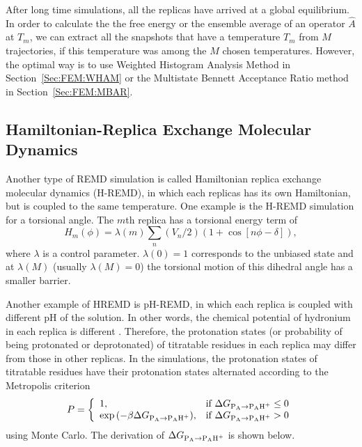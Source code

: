 After long time simulations, all the replicas have arrived at a global equilibrium. In order to calculate the the free energy or the ensemble average of an operator $\hat A$ at $T_m$, we can extract all the snapshots that have a temperature $T_m$ from $M$ trajectories, if this temperature was among the $M$ chosen temperatures. However, the optimal way is to use Weighted Histogram Analysis Method in Section~\ref{Sec:FEM:WHAM} or the Multistate Bennett Acceptance Ratio method in Section~\ref{Sec:FEM:MBAR}.  

\subsection{Hamiltonian-Replica Exchange Molecular Dynamics}
Another type of REMD simulation is called Hamiltonian replica exchange molecular dynamics (H-REMD), in which each replicas has its own Hamiltonian, but is coupled to the same temperature. One example is the H-REMD simulation for a torsional angle. The $m$th replica has a torsional energy term of 
\begin{equation}
	H_m(\phi)=\lambda(m)\sum_n\left(V_n/2\right)\left(1+\cos{\left[n\phi-\delta\right]}\right),
\end{equation}
where $\lambda$ is a control parameter. $\lambda(0)=1$ corresponds to the unbiased state and at $\lambda(M)$ (usually $\lambda(M)=0$) the torsional motion of this dihedral angle has a smaller barrier.

Another example of HREMD is pH-REMD, in which each replica is coupled with different pH of the solution. In other words, the chemical potential of hydronium in each replica is different . Therefore, the protonation states (or probability of being protonated or deprotonated) of titratable residues in each replica may differ from those in other replicas. In the simulations, the protonation states of titratable residues have their protonation states alternated according to the Metropolis criterion
\begin{equation}
	P= 
	\left\{ 
	\begin{array}{ll} 
		1, & \text{if } \Delta G_{\ce{P_{A}}\rightarrow \ce{P_{A}H^{+}}}\leq 0\\ 
		\exp{(-\beta\Delta G_{\ce{P_{A}}\rightarrow \ce{P_{A}H^{+}}})}, & \text{if }\Delta G_{\ce{P_{A}}\rightarrow \ce{P_{A}H^{+}}} >0\\  
	\end{array} 
	\right. 
\end{equation}
using Monte Carlo. The derivation of $\Delta G_{\ce{P_{A}}\rightarrow \ce{P_{A}H^{+}}}$ is shown below. 

